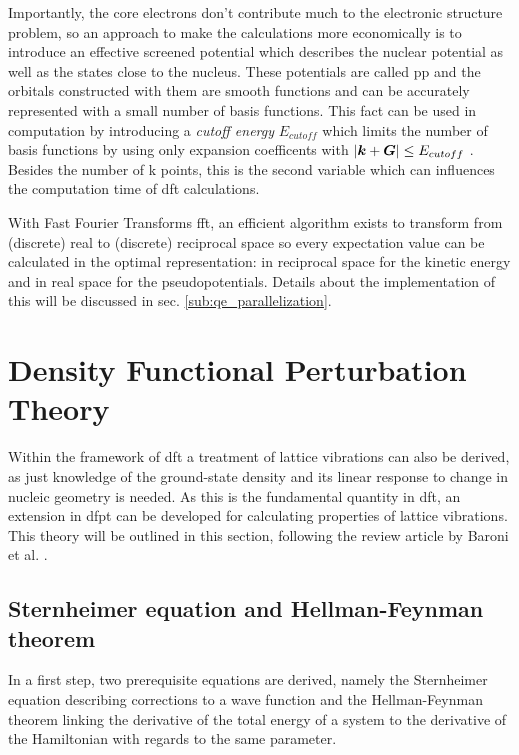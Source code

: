 \documentclass[main.tex]{subfiles}
\begin{document}
Importantly, the core electrons don't contribute much to the electronic structure problem, so an approach to make the calculations more economically is to introduce an effective screened potential which describes the nuclear potential as well as the states close to the nucleus.
These potentials are called \acrfull{pp} and the orbitals constructed with them are smooth functions and can be accurately represented with a small number of basis functions.
This fact can be used in computation by introducing a \emph{cutoff energy} \(E_{cutoff}\) which limits the number of basis functions by using only expansion coefficents with \(\vert \vb*{k} + \vb*{G} \vert \leq E_{cutoff}\) . Besides the number of k points, this is the second variable which can influences the computation time of \acrshort{dft} calculations.

With Fast Fourier Transforms \gls{fft}, an efficient algorithm exists to transform from (discrete) real to (discrete) reciprocal space so every expectation value can be calculated in the optimal representation: in reciprocal space for the kinetic energy and in real space for the pseudopotentials.
Details about the implementation of this will be discussed in sec. \ref{sub:qe_parallelization}.

\section{Density Functional Perturbation Theory}\label{sec:theory_dfpt}

Within the framework of \acrshort{dft} a treatment of lattice vibrations can also be derived, as just knowledge of the ground-state density and its linear response to change in nucleic geometry is needed.
As this is the fundamental quantity in \acrshort{dft}, an extension in \acrshort{dfpt} can be developed for calculating properties of lattice vibrations.
This theory will be outlined in this section, following the review article by Baroni et al. \cite{baroni_phonons_2001}.

\subsection{Sternheimer equation and Hellman-Feynman theorem}

In a first step, two prerequisite equations are derived, namely the Sternheimer equation describing corrections to a wave function and the Hellman-Feynman theorem linking the derivative of the total energy of a system to the derivative of the Hamiltonian with regards to the same parameter.
\end{document}
